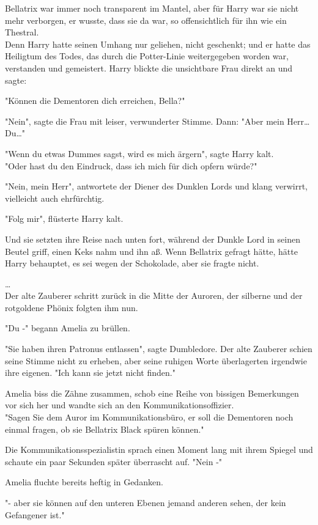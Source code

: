 {Bellatrix war immer noch transparent im Mantel, aber für Harry war sie nicht mehr verborgen, er wusste, dass sie da war, so offensichtlich für ihn wie ein Thestral.\\ Denn Harry hatte seinen Umhang nur geliehen, nicht geschenkt; und er hatte das Heiligtum des Todes, das durch die Potter-Linie weitergegeben worden war, verstanden und gemeistert. Harry blickte die unsichtbare Frau direkt an und sagte:

"Können die Dementoren dich erreichen, Bella?"

"Nein", sagte die Frau mit leiser, verwunderter Stimme. Dann: "Aber mein Herr… Du…"

"Wenn du etwas Dummes sagst, wird es mich ärgern", sagte Harry kalt.\\ "Oder hast du den Eindruck, dass ich mich für dich opfern würde?"

"Nein, mein Herr", antwortete der Diener des Dunklen Lords und klang verwirrt, vielleicht auch ehrfürchtig.

"Folg mir", flüsterte Harry kalt.

Und sie setzten ihre Reise nach unten fort, während der Dunkle Lord in seinen Beutel griff, einen Keks nahm und ihn aß. Wenn Bellatrix gefragt hätte, hätte Harry behauptet, es sei wegen der Schokolade, aber sie fragte nicht.

…\\ Der alte Zauberer schritt zurück in die Mitte der Auroren, der silberne und der rotgoldene Phönix folgten ihm nun.

"Du -" begann Amelia zu brüllen.

"Sie haben ihren Patronus entlassen", sagte Dumbledore. Der alte Zauberer schien seine Stimme nicht zu erheben, aber seine ruhigen Worte überlagerten irgendwie ihre eigenen. "Ich kann sie jetzt nicht finden."

Amelia biss die Zähne zusammen, schob eine Reihe von bissigen Bemerkungen vor sich her und wandte sich an den Kommunikationsoffizier.\\ "Sagen Sie dem Auror im Kommunikationsbüro, er soll die Dementoren noch einmal fragen, ob sie Bellatrix Black spüren können."

Die Kommunikationsspezialistin sprach einen Moment lang mit ihrem Spiegel und schaute ein paar Sekunden später überrascht auf. "Nein -"

Amelia fluchte bereits heftig in Gedanken.

"- aber sie können auf den unteren Ebenen jemand anderen sehen, der kein Gefangener ist."

}

